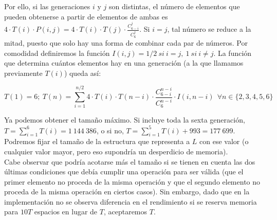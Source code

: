 Por ello, si las generaciones $i$ y $j$ son distintas, el número de elementos que pueden obtenerse a partir de elementos de ambas es $\displaystyle 4 \cdot T(i) \cdot P(i,j) = 4 \cdot T(i) \cdot T(j) \cdot \frac {C_{6-i}^j} {C_6^j}$. Si $i=j$, tal número se reduce a la mitad, puesto que solo hay una forma de combinar cada par de números. Por comodidad definiremos la función $I(i,j) = 1/2\ si\ i=j,\ 1\ si\ i \ne j$. La función que determina cuántos elementos hay en una generación (a la que llamamos previamente $T(i)$) queda así:

$$T(1) = 6;\ T(n) = \sum_{i=1}^{n/2} 4 \cdot T(i) \cdot T(n-i) \cdot \frac {C_{6-i}^{n-i}} {C_6^{n-i}} \cdot I(i,n-i) \ \ \forall n \in \{2,3,4,5,6\}$$

Ya podemos obtener el tamaño máximo. Si incluye toda la sexta generación, $\displaystyle T = \sum_{i=1}^6 T(i) = 1\ 144\ 386$, o si no, $\displaystyle T = \sum_{i=1}^5 T(i) + 993 = 177\ 699$. Podremos fijar el tamaño de la estructura que representa a $L$ con ese valor (o cualquier valor mayor, pero eso supondría un desperdicio de memoria). \\

Cabe observar que podría acotarse más el tamaño si se tienen en cuenta las dos últimas condiciones que debía cumplir una operación para ser válida (que el primer elemento no proceda de la misma operación y que el segundo elemento no proceda de la misma operación en ciertos casos). Sin embargo, dado que en la implementación no se observa diferencia en el rendimiento si se reserva memoria para $10T$ espacios en lugar de $T$, aceptaremos $T$.